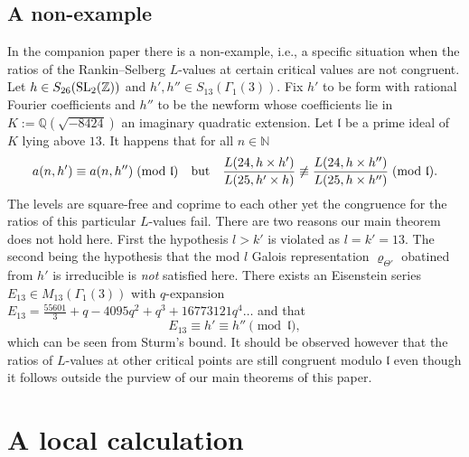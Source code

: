\documentclass[11pt]{amsart}
\begin{document}
\subsection{A non-example}
In the companion paper \cite[Section 3.4]{narayanan-raghuram} there is a non-example, i.e., a specific situation when 
the ratios of the Rankin--Selberg $L$-values at certain critical values are not congruent. Let $h \in S_{26}({\rm SL}_2(\mathbb{Z}))$ and $h', h'' \in S_{13}(\Gamma_1(3)).$
Fix $h'$ to be form with rational Fourier coefficients and $h''$ to be the newform whose coefficients lie in 
$K:= \mathbb{Q}(\sqrt{-8424})$ an imaginary quadratic extension. Let $\mathfrak{l}$ be a prime ideal of $K$ lying above $13$. 
It happens that for all $n \in \mathbb{N}$ 
\begin{equation}
	a(n,h') \equiv a(n,h'') \! \pmod{\mathfrak{l}} \quad \textup{but} \quad 
	\frac{L(24, h \times h')}{L(25,h'\times h)} \not\equiv	\frac{L(24, h \times h'')}{L(25,h\times h'')} \! \pmod{\mathfrak{l}}.
\end{equation}
The levels are square-free and coprime to each other yet the congruence for the ratios of this particular $L$-values fail. There are two reasons our main theorem does not hold here. First the hypothesis $l > k'$ is violated as $l = k' = 13.$ The second being the hypothesis that the mod $l$ Galois representation 
$\varrho_{\Theta'}$ obatined from $h'$ is irreducible is \textit{not} satisfied here. There exists an Eisenstein series 
$E_{13} \in M_{13}(\Gamma_1(3))$ with $q$-expansion $ E_{13} = \frac{55601}{3} +  q - 4095 q^{2} +  q^{3} + 16773121 q^{4} \dots$ and that
\begin{equation*}
	E_{13} \equiv h' \equiv h'' \pmod{\mathfrak{l}},
\end{equation*}
which can be seen from Sturm's bound. It should be observed however that the ratios of $L$-values at other critical points are still congruent modulo $\mathfrak{l}$ 
even though it follows outside the purview of our main theorems of this paper. 



\bigskip
\section{A local calculation}
\label{section: local-calculation}
\end{document}
